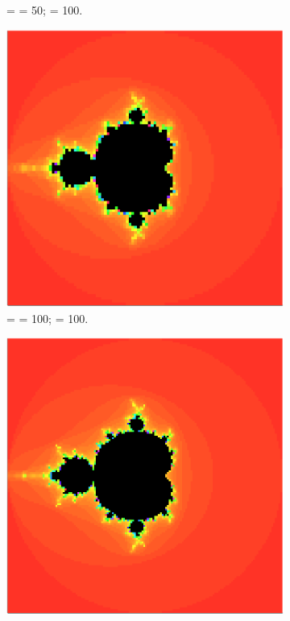 \begin{figure}
\begin{subfigure}[t]{0.3\textwidth}
        \caption{ =  = 50;  = 100.}
    \end{subfigure}
    \begin{subfigure}[t]{0.3\textwidth}
        \centering
        \includegraphics[scale=0.15]{../figures/fractal-n100-mx100}
        \caption{ =  = 100;  = 100.}
    \end{subfigure}
    \begin{subfigure}[t]{0.3\textwidth}
        \centering
        \includegraphics[scale=0.15]{../figures/fractal-n150-mx100}

\end{subfigure}
\end{figure}
